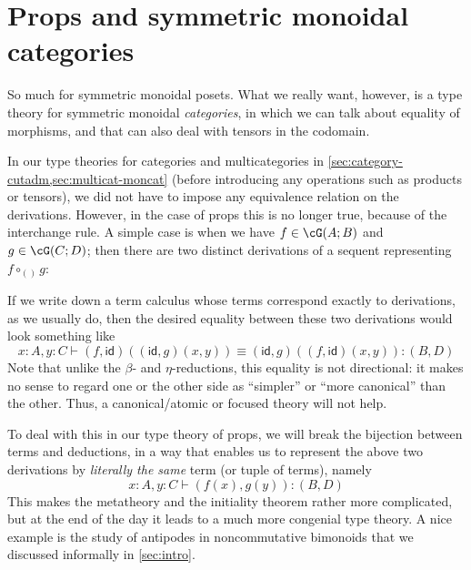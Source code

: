 \documentclass{book}
\def\idfunc{\mathsf{id}}
\let\types\vdash
\begin{document}
\section{Props and symmetric monoidal categories}
\label{sec:prop-smc}

So much for symmetric monoidal posets.
What we really want, however, is a type theory for symmetric monoidal \emph{categories}, in which we can talk about equality of morphisms, and that can also deal with tensors in the codomain.

In our type theories for categories and multicategories in \cref{sec:category-cutadm,sec:multicat-moncat} (before introducing any operations such as products or tensors), we did not have to impose any equivalence relation on the derivations.
However, in the case of props this is no longer true, because of the interchange rule.
A simple case is when we have $f\in \cG(A;B)$ and $g\in\cG(C;D)$; then there are two distinct derivations of a sequent representing $f\circ_{()} g$:
If we write down a term calculus whose terms correspond exactly to derivations, as we usually do, then the desired equality between these two derivations would look something like
\[ x:A, y:C \types (f,\idfunc)((\idfunc,g)(x,y)) \equiv (\idfunc,g)((f,\idfunc)(x,y)) : (B,D) \]
Note that unlike the $\beta$- and $\eta$-reductions, this equality is not directional: it makes no sense to regard one or the other side as ``simpler'' or ``more canonical'' than the other.
Thus, a canonical/atomic or focused theory will not help.

To deal with this in our type theory of props, we will break the bijection between terms and deductions, in a way that enables us to represent the above two derivations by \emph{literally the same} term (or tuple of terms), namely
\[ x:A, y:C \types (f(x),g(y)):(B,D) \]
This makes the metatheory and the initiality theorem rather more complicated, but at the end of the day it leads to a much more congenial type theory.
A nice example is the study of antipodes in noncommutative bimonoids that we discussed informally in \cref{sec:intro}.
\end{document}
